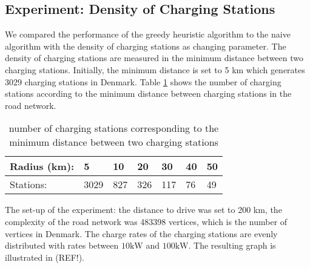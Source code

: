 \subsection{Experiment: Density of Charging Stations}

We compared the performance of the greedy heuristic algorithm to the naive algorithm with the density of charging stations as changing parameter. The
density of charging stations are measured in the minimum distance between two charging stations. Initially, the minimum distance is set to 5 km which generates 3029 charging stations in Denmark. Table \ref{table:chargedensity} shows the number of charging stations according to the minimum distance between charging stations in the road network.

\begin{table}[!htb]
\centering
		\begin{tabular}{ p{1.85cm} p{0.67cm} p{0.63cm} p{0.63cm} p{0.63cm} p{0.63cm} p{0.63cm} } \hline
		Radius (km): & 5 & 10 & 20 & 30 & 40 & 50 \\ \hline
		Stations: & 3029 & 827 & 326 & 117 & 76 & 49 \\ \hline 
		\end{tabular}
		\caption{number of charging stations corresponding to the minimum distance between two charging stations}
	\label{table:chargedensity}
	\end{table}

The set-up of the experiment: the distance to drive was set to 200 km, the complexity of the road network was 483398 vertices, which is the number of vertices in Denmark. The charge rates of the charging stations are evenly distributed with rates between $10 \si{\kW}$ and $100 \si{\kW}$. The resulting graph is illustrated in (REF!).